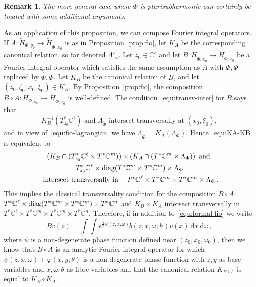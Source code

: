 \documentclass{article}
\newtheorem{remark}[theo]{Remark}
\newcommand{\DD}{\:\!\mathrm{d}}
\newcommand{\phy}{\varphi}
\newcommand{\intint}{\int\!\!\!\!\int}
\newcommand{\CM}{\mathbb{C}}
\newcommand{\h}{\hbar}
\begin{document}
\begin{remark}
  The more general case where $\Phi$ is plurisubharmonic can certainly
  be treated with some additional arguments.
\end{remark}

As an application of this proposition, we can compose Fourier integral
operators. If
$A:\widetilde H_{\Phi,y_0}\to \widetilde H_{\widetilde\Phi, x_0}$ is
as in Proposition~\ref{prop:fio}, let $K_A$ be the corresponding
canonical relation, so far denoted $\Lambda'_\phy$. Let
$z_0\in\CM^\ell$ and let
$B:\widetilde H_{\widetilde \Phi,x_0}\to \widetilde H_{\hat\Phi, z_0}$
be a Fourier integral operator which satisfies the same assumption as
$A$ with $\widetilde\Phi, \Phi$ replaced by
$\hat\Phi, \widetilde\Phi$. Let $K_B$ be the canonical relation of
$B$, and let $(z_0,\zeta_0;x_0,\xi_0)\in K_B$. By
Proposition~\ref{prop:fio}, the composition
$B\circ A:\widetilde H_{\Phi,y_0}\to \widetilde H_{\hat\Phi, z_0}$ is
well-defined. The condition~\eqref{equ:transv-inter} for $B$ says that
\begin{equation}
  \label{equ:KA-KB}
  K_B^{-1}(T^*_{z_0}\CM^\ell) \text{ and } \Lambda_{\widetilde\Phi}
  \text{ intersect transversally at } (x_0,\xi_0),
\end{equation}
and in view of~\eqref{equ:fio-lagrangian} we have
$\Lambda_{\widetilde\Phi} =
K_A(\Lambda_\Phi)$. Hence~\eqref{equ:KA-KB} is equivalent to
\begin{gather}
  \label{equ:KA-KB2}
  \left(K_B\cap(T_{z_0}^*\CM^\ell \times T^* \CM^m)\right) \times
  \left(K_A\cap(T^*\CM^m\times \Lambda_{\Phi})\right) \text{ and }\\
  T_{z_0}^*\CM^\ell \times \textup{diag}(T^* \CM^m \times T^* \CM^m)
  \times \Lambda_\Phi\\
  \text{ intersect transversally in } \quad T^*\CM^\ell \times T^*
  \CM^m \times T^* \CM^m \times \Lambda_\Phi\,.
\end{gather}
This implies the classical transversality condition for the
composition $B\circ A$:
$T^*\CM^\ell \times \textup{diag}(T^* \CM^m \times T^* \CM^m) \times
T^*\CM^n$
and $K_B\times K_A$ intersect transversally in
$T^*\CM^\ell \times T^* \CM^m \times T^* \CM^m \times T^*\CM^n$.
Therefore, if in addition to~\eqref{equ:formal-fio} we write
\begin{equation}
  Bv(z) = \intint e^{\frac{i}{\h}\psi(z,x,\omega)}b(z,x,\omega;\h) v(x)
  \DD x \DD \omega\,,
\end{equation}
where $\psi$ is a non-degenerate phase function defined near
$(z_0,x_0,\omega_0)$, then we know that $B\circ A$ is an analytic
Fourier integral operator for which
$\psi(z,x,\omega)+\phy(x,y,\theta)$ is a non-degenerate phase function
with $z,y$ as base variables and $x,\omega,\theta$ as fibre variables
and that the canonical relation $K_{B\circ A}$ is equal to
$K_B\circ K_A$.
\end{document}
